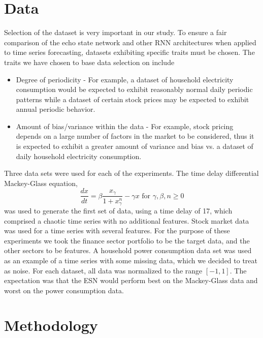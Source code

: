 \documentclass{acm_proc_article-sp}
\begin{document}
\section{Data}
Selection of the dataset is very important in our study. To ensure a fair comparison of the echo state network and other RNN architectures when applied to time series forecasting, datasets exhibiting specific traits must be chosen. The traits we have chosen to base data selection on include
\begin{itemize}
\item Degree of periodicity - For example, a dataset of household electricity consumption would be expected to exhibit reasonably normal daily periodic patterns while a dataset of certain stock prices may be expected to exhibit annual periodic behavior.
\item Amount of bias/variance within the data - For example, stock pricing depends on a large number of factors in the market to be considered, thus it is expected to exhibit a greater amount of variance and bias vs. a dataset of daily household electricity consumption.
\end{itemize}
Three data sets were used for each of the experiments. The time delay differential Mackey-Glass equation,
\begin{equation*}
\frac{dx}{dt} = \beta \frac{x_\gamma}{1+x_{\gamma}^n} - \gamma x \text{  for  } \gamma, \beta, n \ge 0
\end{equation*}
was used to generate the first set of data, using a time delay of 17, which comprised a chaotic time series with no additional features. Stock market data \cite{industryprotfolio} was used for a time series with several features. For the purpose of these experiments we took the finance sector portfolio to be the target data, and the other sectors to be features. A household power consumption data set \cite{Hebrail+Berard:2012} was used as an example of a time series with some missing data, which we decided to treat as noise. For each dataset, all data was normalized to the range $[-1,1]$. The expectation was that the ESN would perform best on the Mackey-Glass data and worst on the power consumption data.

\section{Methodology}
\end{document}
